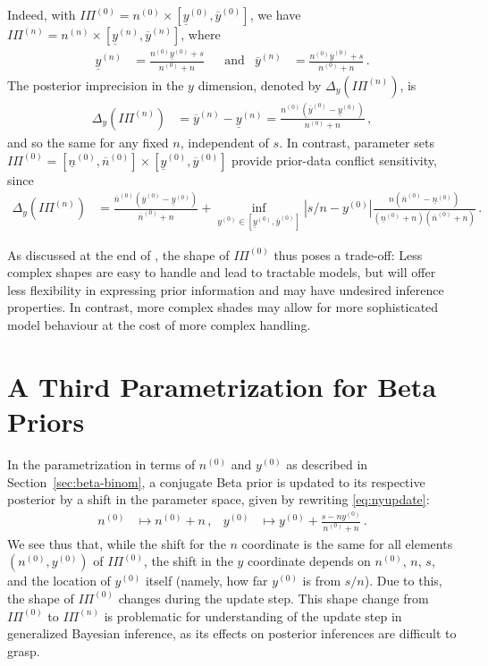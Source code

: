 \documentclass[runningheads,a4paper]{llncs}
\newcommand{\uz}{^{(0)}} %
\newcommand{\un}{^{(n)}} %
\newcommand{\ul}[1]{\underline{#1}}
\newcommand{\ol}[1]{\overline{#1}}
\def\yz{y\uz}
\def\yn{y\un}
\def\yzl{\ul{y}\uz}
\def\yzu{\ol{y}\uz}
\def\ynl{\ul{y}\un}
\def\ynu{\ol{y}\un}
\def\nz{n\uz}
\def\nn{n\un}
\def\nzl{\ul{n}\uz}
\def\nzu{\ol{n}\uz}
\def\PZ{I\!\!\Pi\uz}
\def\PN{I\!\!\Pi\un}
\begin{document}
Indeed, with $\PZ = \nz \times [\yzl, \yzu]$, we have $\PN = \nn \times [\ynl, \ynu]$, where
\begin{align*}
\ynl &= \frac{\nz\yzl + s}{\nz + n} & &\text{and} &
\ynu &= \frac{\nz\yzu + s}{\nz + n}\,.
\end{align*}
The posterior imprecision in the $y$ dimension, denoted by $\Delta_y(\PN)$, is 
\begin{align*}
\Delta_y(\PN) &= \ynu - \ynl = \frac{\nz (\yzu - \yzl)}{\nz +n}\,,
\end{align*}
and so the same for any fixed $n$, independent of $s$.
In contrast, parameter sets $\PZ = [\nzl, \nzu] \times [\yzl, \yzu]$
provide prior-data conflict sensitivity, since
\begin{align*}
\Delta_y(\PN) &= \frac{\nzu (\yzu - \yzl)}{\nzu + n} %
               + \inf_{\yz \in [\yzl,\yzu]} |s/n - \yz| \frac{n (\nzu - \nzl)}{(\nzl + n)(\nzu + n)}\,.
\end{align*}

As discussed at the end of \cite[\S 3.1.4]{2013:diss-gw},
the shape of $\PZ$ thus poses a trade-off:
Less complex shapes are easy to handle and lead to tractable models,
but will offer less flexibility in expressing prior information
and may have undesired inference properties.
In contrast, more complex shades may allow for more sophisticated model behaviour
at the cost of more complex handling.


\section{A Third Parametrization for Beta Priors}
\label{sec:miksworld}

In the parametrization in terms of $\nz$ and $\yz$ as described in Section~\ref{sec:beta-binom},
a conjugate Beta prior is updated to its respective posterior by a shift in the parameter space,
given by rewriting \eqref{eq:nyupdate}:
\begin{align*}
\nz &\mapsto \nz + n\,, &
\yz &\mapsto %
             \yz + \frac{s - n \yz}{\nz+n}\,.
\end{align*}
We see thus that, while the shift for the $n$ coordinate is the same for all elements $(\nz,\yz)$ of $\PZ$,
the shift in the $y$ coordinate depends on $\nz$, $n$, $s$, and the location of $\yz$ itself
(namely, how far $\yz$ is from $s/n$).
Due to this, the shape of $\PZ$ changes during the update step.
This shape change from $\PZ$ to $\PN$ is problematic for understanding of the update step in generalized Bayesian inference,
as its effects on posterior inferences are difficult to grasp.
\end{document}
